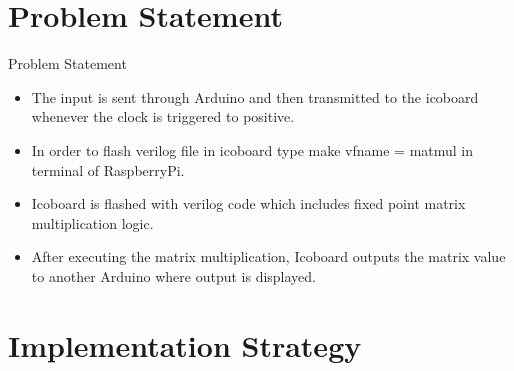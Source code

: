 \documentclass[10pt]{beamer}
\begin{document}
\section{Problem Statement}

\begin{frame}{Problem Statement}
	\begin{itemize}
		 \item The input is sent through Arduino and then transmitted to the icoboard whenever the clock is triggered to positive.
		 \item In order to flash verilog file in icoboard type make v\textunderscore fname = mat\textunderscore mul in terminal of RaspberryPi.
        \item Icoboard is flashed with verilog code which includes fixed point matrix multiplication logic.
        \item After executing the matrix multiplication, Icoboard outputs the matrix value to another Arduino where output is displayed.
	\end{itemize}
	
\end{frame}

\section{Implementation Strategy}
\end{document}
